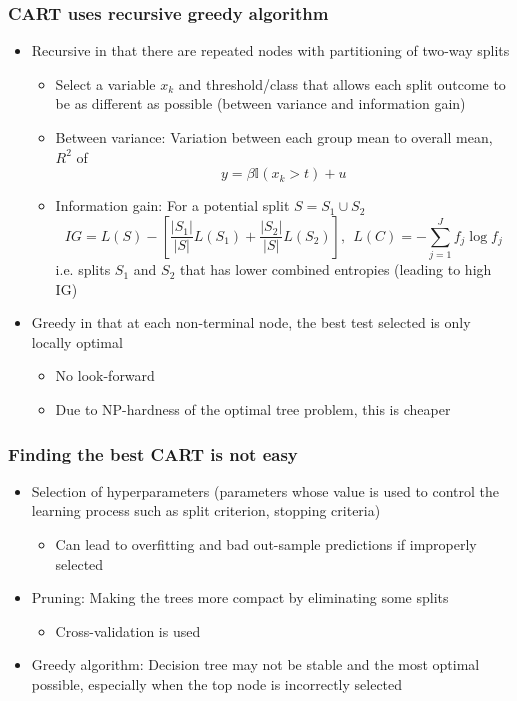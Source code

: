 \documentclass[aspectratio=169]{beamer}
\begin{document}
\begin{frame}
\frametitle{CART uses recursive greedy algorithm}
\begin{itemize}
\item Recursive in that there are repeated nodes with partitioning of two-way splits
\begin{itemize}
\item Select a variable $x_k$ and threshold/class that allows each split outcome to be as different as possible (between variance and information gain)
\item Between variance: Variation between each group mean to overall mean, $R^2$ of
\[
y=\beta\mathbb{I}(x_k>t)+u
\]
\item Information gain: For a potential split $S=S_1\cup S_2$ 
\[
IG = L(S)-\left[\frac{|S_1|}{|S|}L(S_1)+\frac{|S_2|}{|S|}L(S_2)\right], \ \ L(C)=-\sum_{j=1}^J f_j \log{f_j}
\]
i.e. splits $S_1$ and $S_2$ that has lower combined entropies (leading to high IG)
\end{itemize}
\item Greedy in that at each non-terminal node, the best test selected is only locally optimal
\begin{itemize}
\item No look-forward
\item Due to NP-hardness of the optimal tree problem, this is cheaper
\end{itemize}
\end{itemize}
\end{frame}


\begin{frame}
\frametitle{Finding the best CART is not easy}
\begin{itemize}
\item Selection of hyperparameters (parameters whose value is used to control the learning process such as split criterion, stopping criteria)
\begin{itemize}
\item Can lead to overfitting and bad out-sample predictions if improperly selected
\end{itemize}
\item Pruning: Making the trees more compact by eliminating some splits
\begin{itemize}
\item Cross-validation is used
\end{itemize}
\item Greedy algorithm: Decision tree may not be stable and the most optimal possible, especially when the top node is incorrectly selected
\end{itemize}
\end{frame}
\end{document}
